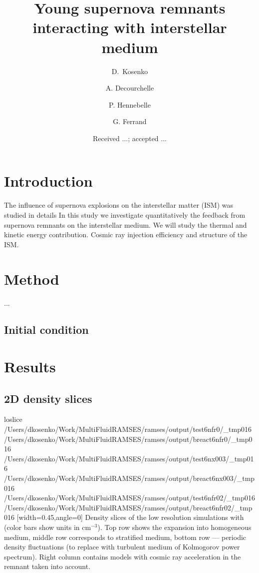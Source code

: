 \documentclass[referee,oldversion]{aa}
\def\basedir{/Users/dkosenko/Work/MultiFluidRAMSES/ramses/output}
\begin{document}
\title{Young supernova remnants interacting with interstellar medium}

\author{D.~Kosenko \and A. Decourchelle \and P. Hennebelle \and G. Ferrand}

\date{Received ...; accepted ... }


\keywords{}

%

\section{Introduction}
 
The influence of supernova explosions on the interstellar matter (ISM) was studied in details
In this study we investigate quantitatively the feedback from supernova remnants on the interstellar medium. We will study the thermal and kinetic energy contribution. Cosmic ray injection efficiency and structure of the ISM.

\section{Method}
...

\subsection{Initial condition}


\section{Results}
\subsection{2D density slices}

\def\thom{\basedir/test6nfr0}
\def\tstra{\basedir/test6nx003}
\def\tturb{\basedir/test6nfr02}
\def\bhom{\basedir/breact6nfr0}
\def\bstra{\basedir/breact6nx003}
\def\bturb{\basedir/breact6nfr02}
\def\slice{_tmp016}
\FIGsi loslice  {\thom/\slice}  {\bhom/\slice}  {\tstra/\slice}  {\bstra/\slice} {\tturb/\slice}  {\bturb/\slice}  [width=0.45\hsize,angle=0]  Density slices of the low resolution simulations with (color bars show units in cm$^{-3}$). Top row shows the expansion into homogeneous medium, middle row corresponds to stratified medium, bottom row --- periodic density fluctuations (to replace with turbulent medium of Kolmogorov power spectrum). Right column contains models with cosmic ray acceleration in the remnant taken into account. 
\end{document}
